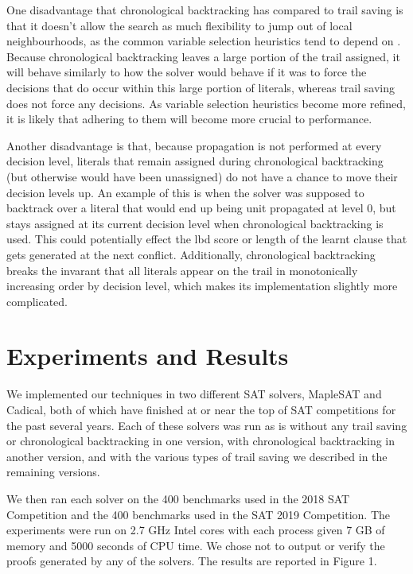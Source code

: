 \documentclass{article}
\begin{document}
One disadvantage that chronological backtracking has compared to trail saving is that it doesn't allow the search as much flexibility to jump out of local neighbourhoods, as the common variable selection heuristics tend to depend on \cite{DBLP:conf/dac/MoskewiczMZZM01, DBLP:conf/sat/2015, DBLP:conf/sat/LiangGPC16}. Because chronological backtracking leaves a large portion of the trail assigned, it will behave similarly to how the solver would behave if it was to force the decisions that do occur within this large portion of literals, whereas trail saving does not force any decisions. As variable selection heuristics become more refined, it is likely that adhering to them will become more crucial to performance.

Another disadvantage is that, because propagation is not performed at every decision level, literals that remain assigned during chronological backtracking (but otherwise would have been unassigned) do not have a chance to move their decision levels up. An example of this is when the solver was supposed to backtrack over a literal that would end up being unit propagated at level 0, but stays assigned at its current decision level when chronological backtracking is used. This could potentially effect the lbd score or length of the learnt clause that gets generated at the next conflict. Additionally, chronological backtracking breaks the invarant that all literals appear on the trail in monotonically increasing order by decision level, which makes its implementation slightly more complicated.

\section{Experiments and Results}
We implemented our techniques in two different SAT solvers, MapleSAT and Cadical, both of which have finished at or near the top of SAT competitions for the past several years. Each of these solvers was run as is without any trail saving or chronological backtracking in one version, with chronological backtracking in another version, and with the various types of trail saving we described in the remaining versions.

We then ran each solver on the 400 benchmarks used in the 2018 SAT Competition and the 400 benchmarks used in the SAT 2019 Competition. The experiments were run on 2.7 GHz Intel cores with each process given 7 GB of memory and 5000 seconds of CPU time. We chose not to output or verify the proofs generated by any of the solvers. The results are reported in Figure 1.
\end{document}
